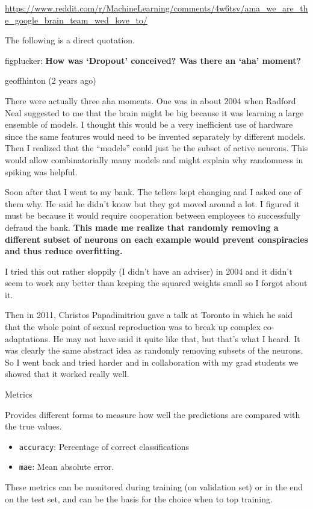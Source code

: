 \documentclass[10pt,ignorenonframetext,]{beamer}
\providecommand{\tightlist}{%
  \setlength{\itemsep}{0pt}\setlength{\parskip}{0pt}}
\begin{document}
\begin{frame}

\url{https://www.reddit.com/r/MachineLearning/comments/4w6tsv/ama_we_are_the_google_brain_team_wed_love_to/}

The following is a direct quotation.

figplucker: \textbf{How was `Dropout' conceived? Was there an `aha'
moment?}

geoffhinton (2 years ago)

There were actually three aha moments. One was in about 2004 when
Radford Neal suggested to me that the brain might be big because it was
learning a large ensemble of models. I thought this would be a very
inefficient use of hardware since the same features would need to be
invented separately by different models. Then I realized that the
``models'' could just be the subset of active neurons. This would allow
combinatorially many models and might explain why randomness in spiking
was helpful.

Soon after that I went to my bank. The tellers kept changing and I asked
one of them why. He said he didn't know but they got moved around a lot.
I figured it must be because it would require cooperation between
employees to successfully defraud the bank. \textbf{This made me realize
that randomly removing a different subset of neurons on each example
would prevent conspiracies and thus reduce overfitting.}

I tried this out rather sloppily (I didn't have an adviser) in 2004 and
it didn't seem to work any better than keeping the squared weights small
so I forgot about it.

Then in 2011, Christos Papadimitriou gave a talk at Toronto in which he
said that the whole point of sexual reproduction was to break up complex
co-adaptations. He may not have said it quite like that, but that's what
I heard. It was clearly the same abstract idea as randomly removing
subsets of the neurons. So I went back and tried harder and in
collaboration with my grad students we showed that it worked really
well.

\end{frame}

\begin{frame}[fragile]

\begin{block}{Metrics}

Provides different forms to measure how well the predictions are
compared with the true values.

\begin{itemize}
\tightlist
\item
  \texttt{accuracy}: Percentage of correct classifications
\item
  \texttt{mae}: Mean absolute error.
\end{itemize}

These metrics can be monitored during training (on validation set) or in
the end on the test set, and can be the basis for the choice when to top
training.

\end{block}

\end{frame}
\end{document}
